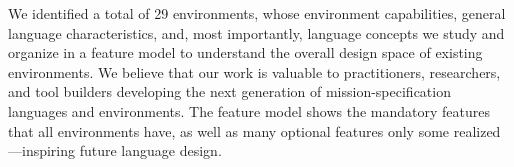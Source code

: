 We identified a total of 29 environments, whose environment capabilities, general language characteristics, and, most importantly, language concepts we study and organize in a feature model to understand the overall design space of existing environments.
We believe that our work is valuable to practitioners, researchers, and tool builders developing the next generation of mission-specification languages and environments. The feature model shows the mandatory features that all environments have, as well as many optional features only some realized---inspiring future language design.



